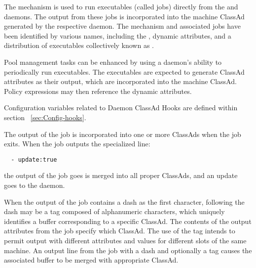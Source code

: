 The  mechanism is
used to run executables (called jobs) directly from the
 and  daemons. 
The output from these jobs is incorporated into the machine ClassAd
generated by the respective daemon.
The mechanism and associated jobs have been identified by various
names, including the , dynamic attributes,
and a distribution of executables collectively known as .

Pool management tasks can be enhanced by using a 
daemon's ability to periodically run executables.
The executables are expected to generate ClassAd attributes as their output,
which are incorporated into the machine ClassAd.
Policy expressions may then reference the dynamic attributes.

Configuration variables related to Daemon ClassAd Hooks are defined
within section ~\ref{sec:Config-hooks}.

The output of the job is incorporated into one or more ClassAds when
the job exits.
When the job outputs the specialized line:
\begin{verbatim}
  - update:true
\end{verbatim}
the output of the job goes is merged into all proper ClassAds,
and an update goes to the  daemon.

When the output of the job contains a dash as the first character,
following the dash may be a tag composed of alphanumeric characters,
which uniquely identifies a buffer corresponding to a specific ClassAd.
The contents of the output attributes from the job specify which ClassAd.
The use of the tag intends to permit output with different attributes 
and values for different slots of the same machine.
An output line from the job with a dash and optionally a tag
causes the associated buffer to be merged with appropriate ClassAd.

